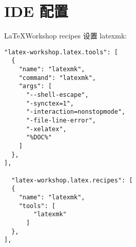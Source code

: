\section{IDE 配置}

\LaTeX Workshop recipes 设置 latexmk:

\begin{lstlisting}
"latex-workshop.latex.tools": [
  {
    "name": "latexmk",
    "command": "latexmk",
    "args": [
      "--shell-escape",
      "-synctex=1",
      "-interaction=nonstopmode",
      "-file-line-error",
      "-xelatex",
      "%DOC%"
    ]
  },
],

  "latex-workshop.latex.recipes": [
  {
    "name": "latexmk",
    "tools": [
        "latexmk"
      ]
  },
],
\end{lstlisting}
